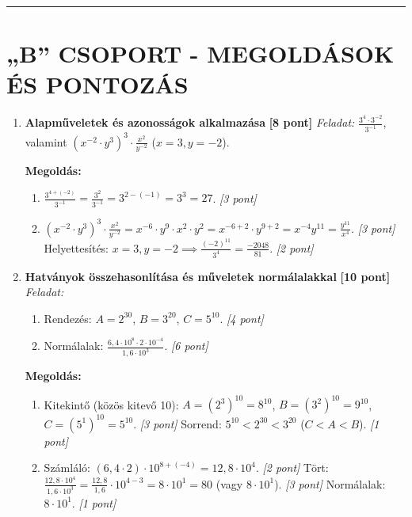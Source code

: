 \documentclass[a4paper,11pt]{article}
\begin{document}
\vspace{1cm}
\hrule
\vspace{1cm}

\section*{„B” CSOPORT - MEGOLDÁSOK ÉS PONTOZÁS}

\begin{enumerate}
  \item \textbf{Alapműveletek és azonosságok alkalmazása} \hfill \textbf{[8 pont]}
  \textit{Feladat:} $\frac{3^4 \cdot 3^{-2}}{3^{-1}}$, valamint $(x^{-2} \cdot y^3)^3 \cdot \frac{x^2}{y^{-2}}$ ($x=3, y=-2$).
  
  \textbf{Megoldás:}
  \begin{enumerate}
    \item $\frac{3^{4+(-2)}}{3^{-1}} = \frac{3^2}{3^{-1}} = 3^{2-(-1)} = 3^3 = 27$. \hfill \textit{[3 pont]}
    \item $(x^{-2} \cdot y^3)^3 \cdot \frac{x^2}{y^{-2}} = x^{-6} \cdot y^9 \cdot x^2 \cdot y^2 = x^{-6+2} \cdot y^{9+2} = x^{-4} y^{11} = \frac{y^{11}}{x^4}$. \hfill \textit{[3 pont]}
    Helyettesítés: $x=3, y=-2 \implies \frac{(-2)^{11}}{3^4} = \frac{-2048}{81}$. \hfill \textit{[2 pont]}
  \end{enumerate}

  \item \textbf{Hatványok összehasonlítása és műveletek normálalakkal} \hfill \textbf{[10 pont]}
  \textit{Feladat:} 
  \begin{enumerate}
    \item Rendezés: $A = 2^{30}$, $B = 3^{20}$, $C = 5^{10}$. \hfill \textit{[4 pont]}
    \item Normálalak: $\frac{6,4 \cdot 10^8 \cdot 2 \cdot 10^{-4}}{1,6 \cdot 10^3}$. \hfill \textit{[6 pont]}
  \end{enumerate}

  \textbf{Megoldás:}
  \begin{enumerate}
    \item Kitekintő (közös kitevő 10): $A = (2^3)^{10} = 8^{10}$, $B = (3^2)^{10} = 9^{10}$, $C = (5^1)^{10} = 5^{10}$. \hfill \textit{[3 pont]}
    Sorrend: $5^{10} < 2^{30} < 3^{20}$ ($C < A < B$). \hfill \textit{[1 pont]}
    \item Számláló: $(6,4 \cdot 2) \cdot 10^{8+(-4)} = 12,8 \cdot 10^4$. \hfill \textit{[2 pont]}
    Tört: $\frac{12,8 \cdot 10^4}{1,6 \cdot 10^3} = \frac{12,8}{1,6} \cdot 10^{4-3} = 8 \cdot 10^1 = 80$ (vagy $8 \cdot 10^1$). \hfill \textit{[3 pont]}
    Normálalak: $8 \cdot 10^1$. \hfill \textit{[1 pont]}
  \end{enumerate}


\end{enumerate}
\end{document}
